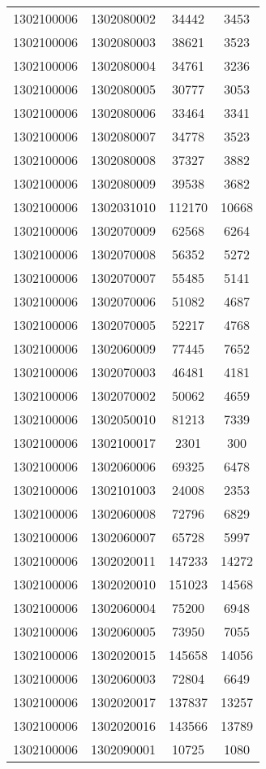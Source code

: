 \begin{longtable}[h]{llcc}
		1302100006 & 1302080002 & 34442 & 3453\\
		1302100006 & 1302080003 & 38621 & 3523\\
		1302100006 & 1302080004 & 34761 & 3236\\
		1302100006 & 1302080005 & 30777 & 3053\\
		1302100006 & 1302080006 & 33464 & 3341\\
		1302100006 & 1302080007 & 34778 & 3523\\
		1302100006 & 1302080008 & 37327 & 3882\\
		1302100006 & 1302080009 & 39538 & 3682\\
		1302100006 & 1302031010 & 112170 & 10668\\
		1302100006 & 1302070009 & 62568 & 6264\\
		1302100006 & 1302070008 & 56352 & 5272\\
		1302100006 & 1302070007 & 55485 & 5141\\
		1302100006 & 1302070006 & 51082 & 4687\\
		1302100006 & 1302070005 & 52217 & 4768\\
		1302100006 & 1302060009 & 77445 & 7652\\
		1302100006 & 1302070003 & 46481 & 4181\\
		1302100006 & 1302070002 & 50062 & 4659\\
		1302100006 & 1302050010 & 81213 & 7339\\
		1302100006 & 1302100017 & 2301 & 300\\
		1302100006 & 1302060006 & 69325 & 6478\\
		1302100006 & 1302101003 & 24008 & 2353\\
		1302100006 & 1302060008 & 72796 & 6829\\
		1302100006 & 1302060007 & 65728 & 5997\\
		1302100006 & 1302020011 & 147233 & 14272\\
		1302100006 & 1302020010 & 151023 & 14568\\
		1302100006 & 1302060004 & 75200 & 6948\\
		1302100006 & 1302060005 & 73950 & 7055\\
		1302100006 & 1302020015 & 145658 & 14056\\
		1302100006 & 1302060003 & 72804 & 6649\\
		1302100006 & 1302020017 & 137837 & 13257\\
		1302100006 & 1302020016 & 143566 & 13789\\
		1302100006 & 1302090001 & 10725 & 1080\\

\end{longtable}
